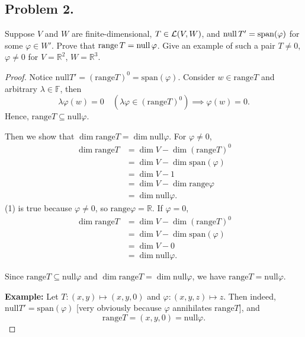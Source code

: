 \documentclass{article}
\begin{document}
\subsection*{Problem 2.}
Suppose $V$ and $W$ are finite-dimensional, $T\in {\cal L}(V,W)$, and 
${\rm null}\, T' = {\rm span} (\varphi)$ for some $\varphi\in W'$. 
Prove that ${\rm range}\, T = {\rm null} \, \varphi$.  
Give an example of such a pair $T\neq 0$, $\varphi\neq 0$ for $V=\mathbb{R}^2$, $W=\mathbb{R}^3$.
\begin{proof}
    Notice $\mathrm{null} T' = (\mathrm{range} T)^0 = \mathrm{span}(\varphi)$. 
    Consider $w\in\mathrm{range}T$ and arbitrary $\lambda\in\mathbb{F}$, then 
    $$\lambda \varphi(w) = 0 \quad (\lambda\varphi \in (\mathrm{range}T)^0) \implies \varphi(w)=0.$$
    Hence, $\mathrm{range}T\subseteq\mathrm{null}\varphi$.

    Then we show that $\dim\mathrm{range}T=\dim\mathrm{null}\varphi$. For $\varphi\neq 0$,
    \begin{align}
        \dim \mathrm{range}T & = \dim V - \dim (\mathrm{range}T)^0 \nonumber \\
        & = \dim V - \dim \mathrm{span}(\varphi) \nonumber \\
        & = \dim V - 1 \nonumber \\
        & = \dim V - \dim \mathrm{range}\varphi \\
        & = \dim \mathrm{null}\varphi. \nonumber
    \end{align}
    (1) is true because $\varphi \neq 0$, so $\mathrm{range}\varphi =\mathbb{R}$.
    If $\varphi = 0$,
    \begin{align}
        \dim \mathrm{range}T & = \dim V - \dim (\mathrm{range}T)^0 \nonumber \\
        & = \dim V - \dim \mathrm{span}(\varphi) \nonumber \\
        & = \dim V - 0 \nonumber \\
        & = \dim \mathrm{null}\varphi. \nonumber
    \end{align}

    Since $\mathrm{range}T\subseteq\mathrm{null}\varphi$ and 
    $\dim\mathrm{range}T=\dim\mathrm{null}\varphi$, we have
    $\mathrm{range}T=\mathrm{null}\varphi$.

    \textbf{Example:} Let $T:(x,y)\mapsto (x,y,0)$ and $\varphi:(x,y,z)\mapsto z$. Then indeed, 
    $\mathrm{null}T'=\mathrm{span}(\varphi)$ [very obviously because $\varphi$ annihilates $\mathrm{range}T$], and 
    $$\mathrm{range}T=(x,y,0)=\mathrm{null}\varphi.$$
\end{proof}
\end{document}
